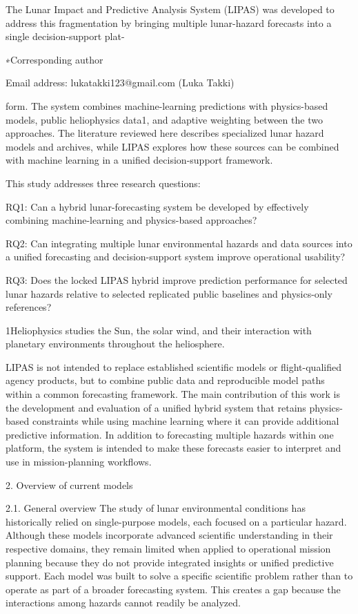 The Lunar Impact and Predictive Analysis System (LIPAS) was developed to address this fragmentation by bringing multiple lunar-hazard forecasts into a single decision-support plat-

∗Corresponding author

Email address: lukatakki123@gmail.com (Luka Takki)

form. The system combines machine-learning predictions with physics-based models, public heliophysics data1, and adaptive weighting between the two approaches. The literature reviewed here describes specialized lunar hazard models and archives, while LIPAS explores how these sources can be combined with machine learning in a unified decision-support framework.

This study addresses three research questions:

RQ1: Can a hybrid lunar-forecasting system be developed by effectively combining machine-learning and physics-based approaches?

RQ2: Can integrating multiple lunar environmental hazards and data sources into a unified forecasting and decision-support system improve operational usability?

RQ3: Does the locked LIPAS hybrid improve prediction performance for selected lunar hazards relative to selected replicated public baselines and physics-only references?

1Heliophysics studies the Sun, the solar wind, and their interaction with planetary environments throughout the heliosphere.

LIPAS is not intended to replace established scientific models or flight-qualified agency products, but to combine public data and reproducible model paths within a common forecasting framework. The main contribution of this work is the development and evaluation of a unified hybrid system that retains physics-based constraints while using machine learning where it can provide additional predictive information. In addition to forecasting multiple hazards within one platform, the system is intended to make these forecasts easier to interpret and use in mission-planning workflows.

2. Overview of current models

2.1. General overview The study of lunar environmental conditions has historically relied on single-purpose models, each focused on a particular hazard. Although these models incorporate advanced scientific understanding in their respective domains, they remain limited when applied to operational mission planning because they do not provide integrated insights or unified predictive support. Each model was built to solve a specific scientific problem rather than to operate as part of a broader forecasting system. This creates a gap because the interactions among hazards cannot readily be analyzed.

